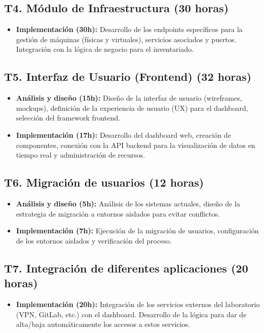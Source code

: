 \subsection*{T4. Módulo de Infraestructura (30 horas)}
\begin{itemize}
    \item \textbf{Implementación (30h):} Desarrollo de los endpoints específicos para la gestión de máquinas (físicas y virtuales), servicios asociados y puertos. Integración con la lógica de negocio para el inventariado.
\end{itemize}

\subsection*{T5. Interfaz de Usuario (Frontend) (32 horas)}
\begin{itemize}
    \item \textbf{Análisis y diseño (15h):} Diseño de la interfaz de usuario (wireframes, mockups), definición de la experiencia de usuario (UX) para el dashboard, selección del framework frontend.
    \item \textbf{Implementación (17h):} Desarrollo del dashboard web, creación de componentes, conexión con la API backend para la visualización de datos en tiempo real y administración de recursos.
\end{itemize}

\subsection*{T6. Migración de usuarios (12 horas)}
\begin{itemize}
    \item \textbf{Análisis y diseño (5h):} Análisis de los sistemas actuales, diseño de la estrategia de migración a entornos aislados para evitar conflictos.
    \item \textbf{Implementación (7h):} Ejecución de la migración de usuarios, configuración de los entornos aislados y verificación del proceso.
\end{itemize}

\subsection*{T7. Integración de diferentes aplicaciones (20 horas)}
\begin{itemize}
    \item \textbf{Implementación (20h):} Integración de los servicios externos del laboratorio (VPN, GitLab, etc.) con el dashboard. Desarrollo de la lógica para dar de alta/baja automáticamente los accesos a estos servicios.
\end{itemize}

